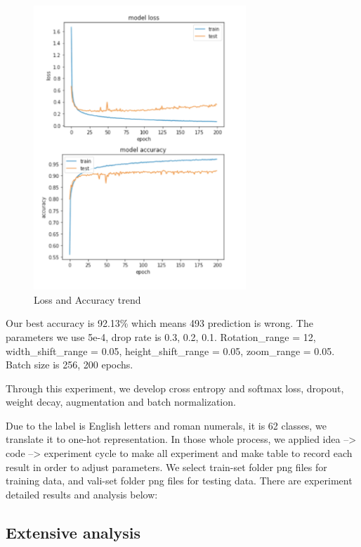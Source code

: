 \documentclass[twoside,twocolumn,10.8pt]{article}
\begin{document}
\begin{figure}[h]
\includegraphics[width=8cm]{acc_loss.png}
\caption{Loss and Accuracy trend}\label{fig1}
\centering
\end{figure}




\noindent Our best accuracy is 92.13\% which means 493 prediction is wrong. The parameters we use 5e-4, drop rate is 0.3, 0.2, 0.1. Rotation\_range = 12, width\_shift\_range = 0.05, height\_shift\_range = 0.05, zoom\_range = 0.05. Batch size is 256, 200 epochs.


\noindent Through this experiment, we develop cross entropy and softmax loss, dropout, weight decay, augmentation and batch normalization.


\noindent Due to the label is English letters and roman numerals, it is 62 classes, we translate it to one-hot representation. In those whole process, we applied idea --> code --> experiment cycle to make all experiment and make table to record each result in order to adjust parameters. 
We select train-set folder png files for training data, and vali-set folder png files for testing data. There are experiment detailed results and analysis below:

\subsection{Extensive analysis}
\end{document}
